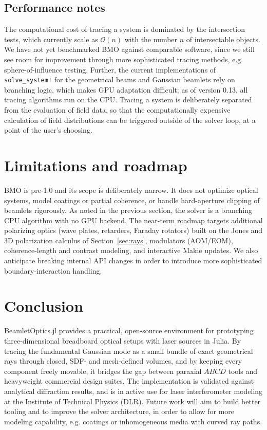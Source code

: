 \documentclass{juliacon}
\begin{document}
\subsection{Performance notes}

The computational cost of tracing a system is dominated by the
intersection tests, which currently scale as $\mathcal{O}(n)$ with the number $n$ of
intersectable objects. We have not yet benchmarked BMO against
comparable software, since we still see room for improvement through
more sophisticated tracing methods, e.g. sphere-of-influence testing.
Further, the current implementations of \texttt{solve\_system!} for the
geometrical beams and Gaussian beamlets rely on branching logic, which
makes GPU adaptation difficult; as of version 0.13, all tracing
algorithms run on the CPU. Tracing a system is deliberately
separated from the evaluation of field data, so that the computationally
expensive calculation of field distributions can be triggered outside of
the solver loop, at a point of the user's choosing.

\section{Limitations and roadmap}

BMO is pre-1.0 and its scope is deliberately narrow. It does not
optimize optical systems, model coatings or partial coherence, or handle
hard-aperture clipping of beamlets rigorously. As noted in the previous
section, the solver is a branching CPU algorithm with no GPU backend.
The near-term roadmap targets additional polarizing optics (wave plates,
retarders, Faraday rotators) built on the Jones and 3D polarization
calculus of Section~\ref{sec:rays}, modulators (AOM/EOM),
coherence-length and contrast modeling, and interactive Makie updates.
We also anticipate breaking internal API changes in order to introduce more
sophisticated boundary-interaction handling.

\section{Conclusion}

BeamletOptics.jl provides a practical, open-source environment for
prototyping three-dimensional breadboard optical setups with laser
sources in Julia. By tracing the fundamental Gaussian mode as a small
bundle of exact geometrical rays through closed, SDF- and mesh-defined volumes,
and by keeping every component freely movable, it bridges the gap
between paraxial $ABCD$ tools and heavyweight commercial design suites.
The implementation is validated against analytical diffraction results,
and is in active use for laser interferometer modeling at the Institute
of Technical Physics (DLR). Future work will aim to build better tooling
and to improve the solver architecture, in order to allow for more
modeling capability, e.g. coatings or inhomogeneous media with curved
ray paths.
\end{document}
